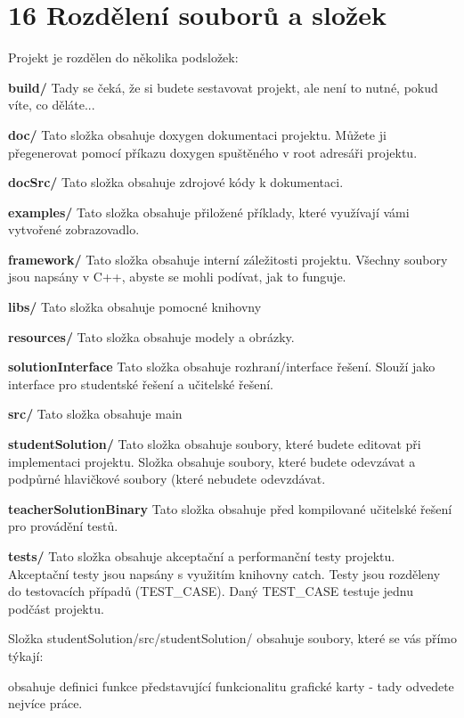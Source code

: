 \chapter{16 Rozdělení souborů a složek}
\hypertarget{p16_rozdeleni}{}\label{p16_rozdeleni}
Projekt je rozdělen do několika podsložek\+:

{\bfseries{build/}} Tady se čeká, že si budete sestavovat projekt, ale není to nutné, pokud víte, co děláte...

{\bfseries{doc/}} Tato složka obsahuje doxygen dokumentaci projektu. Můžete ji přegenerovat pomocí příkazu doxygen spuštěného v root adresáři projektu.

{\bfseries{doc\+Src/}} Tato složka obsahuje zdrojové kódy k dokumentaci.

{\bfseries{examples/}} Tato složka obsahuje přiložené příklady, které využívají vámi vytvořené zobrazovadlo.

{\bfseries{framework/}} Tato složka obsahuje interní záležitosti projektu. Všechny soubory jsou napsány v C++, abyste se mohli podívat, jak to funguje.

{\bfseries{libs/}} Tato složka obsahuje pomocné knihovny

{\bfseries{resources/}} Tato složka obsahuje modely a obrázky.

{\bfseries{solution\+Interface}} Tato složka obsahuje rozhraní/interface řešení. Slouží jako interface pro studentské řešení a učitelské řešení.

{\bfseries{src/}} Tato složka obsahuje main

{\bfseries{student\+Solution/}} Tato složka obsahuje soubory, které budete editovat při implementaci projektu. Složka obsahuje soubory, které budete odevzávat a podpůrné hlavičkové soubory (které nebudete odevzdávat.

{\bfseries{teacher\+Solution\+Binary}} Tato složka obsahuje před kompilované učitelské řešení pro provádění testů.

{\bfseries{tests/}} Tato složka obsahuje akceptační a performanční testy projektu. Akceptační testy jsou napsány s využitím knihovny catch. Testy jsou rozděleny do testovacích případů (TEST\+\_\+\+CASE). Daný TEST\+\_\+\+CASE testuje jednu podčást projektu.

Složka student\+Solution/src/student\+Solution/ obsahuje soubory, které se vás přímo týkají\+:

 obsahuje definici funkce představující funkcionalitu grafické karty  -\/ tady odvedete nejvíce práce.

